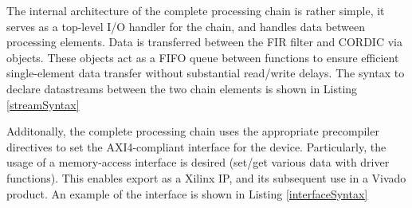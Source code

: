 \documentclass[11pt]{report}
\begin{document}
The internal architecture of the complete processing chain is rather simple, it serves as a top-level I/O handler for the chain, and handles data between processing elements. Data is transferred between the FIR filter and CORDIC via  objects. These objects act as a \ac{FIFO} queue between functions to ensure efficient single-element data transfer without substantial read/write delays. The syntax to declare datastreams between the two chain elements is shown in Listing \ref{streamSyntax}

        \begin{singlespace}
            
        \end{singlespace}

Additonally, the complete processing chain uses the appropriate precompiler directives to set the AXI4-compliant interface for the device. Particularly, the usage of a memory-access interface is desired (set/get various data with driver functions). This enables export as a Xilinx IP, and its subsequent use in a Vivado product. An example of the interface is shown in Listing \ref{interfaceSyntax}

        \begin{singlespace}
            
        \end{singlespace}
        
        
        
        
\end{document}
